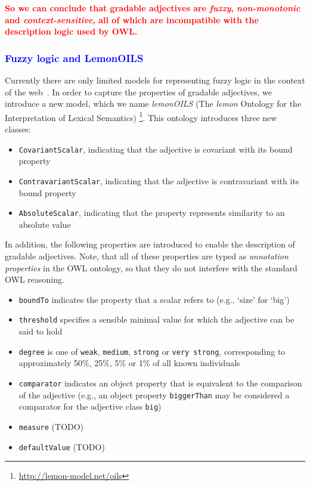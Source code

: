 \documentclass[11pt]{article}
\begin{document}
\textbf{\textcolor{red}{So we can conclude that gradable adjectives are \emph{fuzzy}, \emph{non-monotonic} 
and \emph{context-sensitive}, all of which are incompatible with the description 
logic used by OWL.}} 

\subsubsection{\textcolor{blue}{Fuzzy logic and LemonOILS}}
Currently there are only limited models for representing fuzzy 
logic in the context of the web~\cite{zhao2008uncertainty}. In order to capture the 
properties of gradable adjectives, we introduce a new model, which we name 
\emph{lemonOILS} (The \emph{lemon} Ontology for the Interpretation of Lexical Semantics)
\footnote{\url{http://lemon-model.net/oils}}. This ontology introduces three 
new classes:

\begin{itemize}
	\item {\tt CovariantScalar}, indicating that the adjective is covariant with its bound property
	\item {\tt ContravariantScalar}, indicating that the adjective is contravariant with its bound property
	\item {\tt AbsoluteScalar}, indicating that the property represents similarity to an absolute value
\end{itemize}

In addition, the following properties are introduced to enable the description 
of gradable adjectives. Note, that all of these properties are typed as 
\emph{annotation properties} in the OWL ontology, so that they do not interfere 
with the standard OWL reasoning.

\begin{itemize}
	\item {\tt boundTo} indicates the property that a scalar refers to (e.g., `size' for `big')
	\item {\tt threshold} specifies a sensible minimal value for which the adjective can be said to hold
	\item {\tt degree} is one of {\tt weak}, {\tt medium}, {\tt strong} or {\tt very strong}, corresponding to approximately 50\%, 25\%, 5\% or 1\% of all known individuals
	\item {\tt comparator} indicates an object property that is equivalent to the comparison of the adjective (e.g., an object property {\tt biggerThan} may be considered a comparator for the adjective class {\tt big})
	\item {\tt measure} (TODO)
	\item {\tt defaultValue} (TODO)
\end{itemize}
\end{document}
